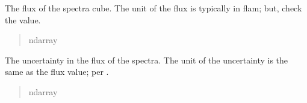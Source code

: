 \documentclass[letterpaper,11pt,english]{sphinxmanual}
\begin{document}
\begin{savenotes}
\begin{fulllineitems}
\begin{savenotes}
\begin{fulllineitems}
\begin{quote}
\begin{description}
\end{description}\end{quote}

\end{fulllineitems}\end{savenotes}


\begin{savenotes}\begin{fulllineitems}
\label{\detokenize{code/lezargus.container.image:lezargus.container.image.LezargusImage.data}}
\pysigstartsignatures
{}
\pysigstopsignatures
\sphinxAtStartPar
The flux of the spectra cube. The unit of the flux is typically
in flam; but, check the  value.
\begin{quote}\begin{description}
\sphinxAtStartPar
ndarray

\end{description}\end{quote}

\end{fulllineitems}\end{savenotes}


\begin{savenotes}\begin{fulllineitems}
\label{\detokenize{code/lezargus.container.image:lezargus.container.image.LezargusImage.uncertainty}}
\pysigstartsignatures
{}
\pysigstopsignatures
\sphinxAtStartPar
The uncertainty in the flux of the spectra. The unit of the uncertainty
is the same as the flux value; per .
\begin{quote}\begin{description}
\sphinxAtStartPar
ndarray

\end{description}\end{quote}

\end{fulllineitems}\end{savenotes}


\end{fulllineitems}
\end{savenotes}
\end{document}

